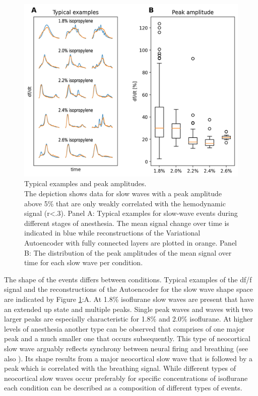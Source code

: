\begin{figure}[!htb]
\centering
\includegraphics[width=\textwidth,height=\textheight,keepaspectratio]{Figures/typical_examples_and_peak_amplitudes}
\decoRule
\caption[Typical examples and peak amplitudes]{Typical examples and peak amplitudes.\\The depiction shows data for slow waves with a peak amplitude above 5\% that are only weakly correlated with the hemodynamic signal (r<.3). Panel A: Typical examples for slow-wave events during different stages of anesthesia. The mean signal change over time is indicated in blue while reconstructions of the Variational Autoencoder with fully connected layers are plotted in orange. Panel B: The distribution of the peak amplitudes of the mean signal over time for each slow wave per condition.}
\label{fig:typical_examples_and_peak_amplitudes}
\end{figure}
The shape of the events differs between conditions. Typical examples of the df/f signal and the reconstructions of the Autoencoder for the slow wave shape space are indicated by Figure \ref{fig:typical_examples_and_peak_amplitudes}:A. At 1.8\% isoflurane slow waves are present that have an extended up state and multiple peaks. Single peak waves and waves with two larger peaks are especially characteristic for 1.8\% and 2.0\% isoflurane. At higher levels of anesthesia another type can be observed that comprises of one major peak and a much smaller one that occurs subsequently. This type of neocortical slow wave arguably reflects synchrony between neural firing and breathing (see also \cite{tort2018parallel}). Its shape results from a major neocortical slow wave that is followed by a peak which is correlated with the breathing signal. While different types of neocortical slow waves occur preferably for specific concentrations of isoflurane each condition can be described as a composition of different types of events.\\
